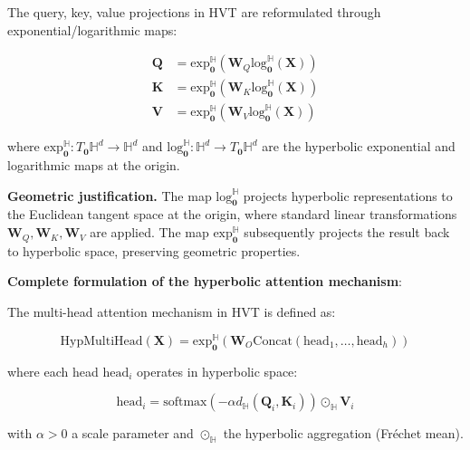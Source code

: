\begin{definition}\label{def:hvt_projections}
The query, key, value projections in HVT are reformulated through exponential/logarithmic maps:

\begin{align}
    \mathbf{Q} &= \text{exp}_{\mathbf{0}}^{\mathbb{H}}(\mathbf{W}_Q \text{log}_{\mathbf{0}}^{\mathbb{H}}(\mathbf{X})) \\
    \mathbf{K} &= \text{exp}_{\mathbf{0}}^{\mathbb{H}}(\mathbf{W}_K \text{log}_{\mathbf{0}}^{\mathbb{H}}(\mathbf{X})) \\
    \mathbf{V} &= \text{exp}_{\mathbf{0}}^{\mathbb{H}}(\mathbf{W}_V \text{log}_{\mathbf{0}}^{\mathbb{H}}(\mathbf{X}))
    \label{eq:hyperbolic_projections}
\end{align}

where $\text{exp}_{\mathbf{0}}^{\mathbb{H}}: T_{\mathbf{0}}\mathbb{H}^d \to \mathbb{H}^d$ and $\text{log}_{\mathbf{0}}^{\mathbb{H}}: \mathbb{H}^d \to T_{\mathbf{0}}\mathbb{H}^d$ are the hyperbolic exponential and logarithmic maps at the origin.
\end{definition}

\textbf{Geometric justification.}\label{rem:hvt_geometry} The map $\text{log}_{\mathbf{0}}^{\mathbb{H}}$ projects hyperbolic representations to the Euclidean tangent space at the origin, where standard linear transformations $\mathbf{W}_Q, \mathbf{W}_K, \mathbf{W}_V$ are applied. The map $\text{exp}_{\mathbf{0}}^{\mathbb{H}}$ subsequently projects the result back to hyperbolic space, preserving geometric properties.

\textbf{Complete formulation of the hyperbolic attention mechanism}:

\begin{definition}\label{def:hvt_multihead}
The multi-head attention mechanism in HVT is defined as:

\begin{equation}
\text{HypMultiHead}(\mathbf{X}) = \text{exp}_{\mathbf{0}}^{\mathbb{H}}\left(\mathbf{W}_O \text{Concat}(\text{head}_1, \ldots, \text{head}_h)\right)
\label{eq:hvt_multihead}
\end{equation}

where each head $\text{head}_i$ operates in hyperbolic space:

\begin{equation}
\text{head}_i = \text{softmax}\left(-\alpha d_{\mathbb{H}}(\mathbf{Q}_i, \mathbf{K}_i)\right) \odot_{\mathbb{H}} \mathbf{V}_i
\label{eq:hvt_head}
\end{equation}

with $\alpha > 0$ a scale parameter and $\odot_{\mathbb{H}}$ the hyperbolic aggregation (Fréchet mean).
\end{definition}

